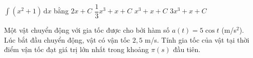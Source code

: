 \begin{ex}%
	$\displaystyle\int\left(x^2+1\right)\mathrm{\,d}x$  bằng
	\choice 
		{$2x+C$} 
		{\True $\dfrac{1}{3}x^3+x+C$} 
		{$x^3+x+C$} 
		{$3x^3+x+C$} 
\end{ex}

\begin{bt}%
	Một vật chuyển động với gia tốc được cho bởi hàm số $a(t) = 5\cos t$ (m/s$^2$). Lúc bắt đầu chuyển động, vật có vận tốc $2{,}5$  m/s. Tính gia tốc của vật tại thời điểm vận tốc đạt giá trị lớn nhất trong khoảng $\pi(s)$ đầu tiên.
\end{bt}

